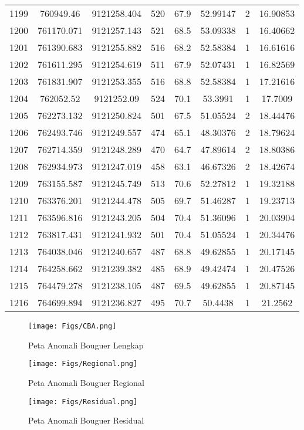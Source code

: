 \begin{longtable}{cccccccc}
1199 & 760949.46       & 9121258.404      & 520     & 67.9  & 52.99147 & 2  & 16.90853 \\
1200 & 761170.071      & 9121257.143      & 521     & 68.5  & 53.09338 & 1  & 16.40662 \\
1201 & 761390.683      & 9121255.882      & 516     & 68.2  & 52.58384 & 1  & 16.61616 \\
1202 & 761611.295      & 9121254.619      & 511     & 67.9  & 52.07431 & 1  & 16.82569 \\
1203 & 761831.907      & 9121253.355      & 516     & 68.8  & 52.58384 & 1  & 17.21616 \\
1204 & 762052.52       & 9121252.09       & 524     & 70.1  & 53.3991  & 1  & 17.7009  \\
1205 & 762273.132      & 9121250.824      & 501     & 67.5  & 51.05524 & 2  & 18.44476 \\
1206 & 762493.746      & 9121249.557      & 474     & 65.1  & 48.30376 & 2  & 18.79624 \\
1207 & 762714.359      & 9121248.289      & 470     & 64.7  & 47.89614 & 2  & 18.80386 \\
1208 & 762934.973      & 9121247.019      & 458     & 63.1  & 46.67326 & 2  & 18.42674 \\
1209 & 763155.587      & 9121245.749      & 513     & 70.6  & 52.27812 & 1  & 19.32188 \\
1210 & 763376.201      & 9121244.478      & 505     & 69.7  & 51.46287 & 1  & 19.23713 \\
1211 & 763596.816      & 9121243.205      & 504     & 70.4  & 51.36096 & 1  & 20.03904 \\
1212 & 763817.431      & 9121241.932      & 501     & 70.4  & 51.05524 & 1  & 20.34476 \\
1213 & 764038.046      & 9121240.657      & 487     & 68.8  & 49.62855 & 1  & 20.17145 \\
1214 & 764258.662      & 9121239.382      & 485     & 68.9  & 49.42474 & 1  & 20.47526 \\
1215 & 764479.278      & 9121238.105      & 487     & 69.5  & 49.62855 & 1  & 20.87145 \\
1216 & 764699.894      & 9121236.827      & 495     & 70.7  & 50.4438  & 1  & 21.2562  \\ \hline
\hline
\end{longtable}

\begin{figure}
    \centering
    \texttt{[image: Figs/CBA.png]}
    \caption{Peta Anomali Bouguer Lengkap}
    \label{fig:CBA}
\end{figure}

\begin{figure}
    \centering
    \texttt{[image: Figs/Regional.png]}
    \caption{Peta Anomali Bouguer Regional}
    \label{fig:Regional}
\end{figure}

\begin{figure}[h]
    \centering
    \texttt{[image: Figs/Residual.png]}
    \caption{Peta Anomali Bouguer Residual}
    \label{fig:Residual}
\end{figure}
